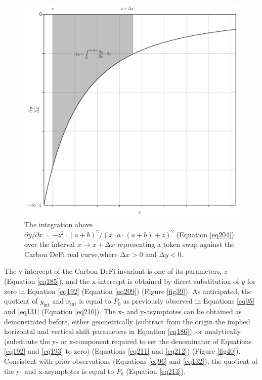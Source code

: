 \documentclass{article}
\begin{document}
\begin{figure}[ht]
    \centering
    \includegraphics[width=\textwidth]{fig38.png}
    \captionsetup{
        justification=raggedright,
        singlelinecheck=false,
        font=small,
        labelfont=bf,
        labelsep=quad,
        format=plain
    }
    \caption{The integration above $\partial y / \partial x = - z^{2} \cdot \left( a + b \right)^{2} / \left( x \cdot a \cdot \left( a + b \right) + z \right)^{2}$ (Equation \ref{eq204}) over the interval $x \rightarrow x + \mathrm{\Delta}x$ representing a token swap against the Carbon DeFi real curve,where $\mathrm{\Delta}x > 0$ and $\mathrm{\Delta}y < 0$.}
    \label{fig38}
\end{figure}

The y-intercept of the Carbon DeFi invariant is one of its parameters, $z$ (Equation \ref{eq185}), and the x-intercept is obtained by direct substitution of $y$ for zero in Equation \ref{eq192} (Equation \ref{eq209}) (Figure \ref{fig39}). As anticipated, the quotient of $y_{\text{int}}$ and $x_{\text{int}}$ is equal to $P_{0}$ as previously observed in Equations \ref{eq95} and \ref{eq131} (Equation \ref{eq210}). The x- and y-asymptotes can be obtained as demonstrated before, either geometrically (subtract from the origin the implied horizontal and vertical shift parameters in Equation \ref{eq186}), or analytically (substitute the y- or x-component required to set the denominator of Equations \ref{eq192} and \ref{eq193} to zero) (Equations \ref{eq211} and \ref{eq212}) (Figure \ref{fig40}). Consistent with prior observations (Equations \ref{eq96} and \ref{eq132}), the quotient of the y- and x-asymptotes is equal to $P_{0}$ (Equation \ref{eq213}). 
\end{document}
